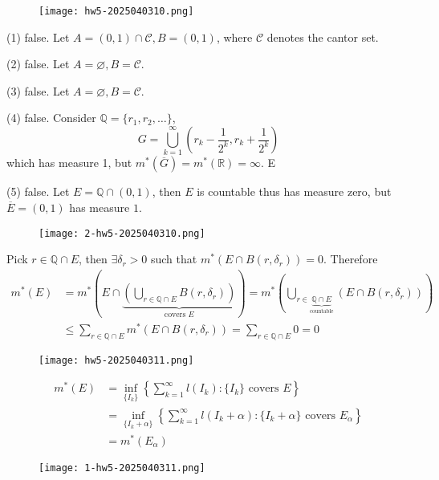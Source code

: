 \begin{figure}[H]
\centering
\texttt{[image: hw5-2025040310.png]}
\label{}
\end{figure}
(1) false. Let $A=(0,1)\cap \mathcal{C},B=(0,1)$, where $\mathcal{C}$ denotes the cantor set.

(2) false. Let $A=\varnothing,B=\mathcal{C}$.

(3) false. Let $A=\varnothing,B=\mathcal{C}$.

(4) false. Consider $\mathbb{Q}=\{ r_1,r_2,\dots \}$,
\[
G=\bigcup_{k=1}^{\infty} \left( r_k-\frac{1}{2^{k}}, r_k+\frac{1}{2^{k}}\right)
\]
which has measure 1, but $m^{*}(\overline{G})=m^{*}(\mathbb{R})=\infty$. E

(5) false. Let $E=\mathbb{Q}\cap(0,1)$, then $E$ is countable thus has measure zero, but $\overline{E}=(0,1)$ has measure $1$.

\begin{figure}[H]
\centering
\texttt{[image: 2-hw5-2025040310.png]}
\label{}
\end{figure}
Pick $r\in \mathbb{Q}\cap E$, then $\exists\delta_{r}>0$ such that $m^{*}(E\cap B(r,\delta_{r}))=0$. Therefore
\[
\begin{aligned}
m^{*}(E) & =m^{*}\left( E\cap\underbrace{ \left( \bigcup_{r\in \mathbb{Q}\cap E}B(r,\delta_{r}) \right) }_{ \text{covers }E } \right)=m^{*}\left( \bigcup_{r\in \underbrace{ \mathbb{Q}\cap E }_{ \text{countable} }}(E\cap B(r,\delta_{r})) \right) \\
 & \leq \sum_{r\in \mathbb{Q}\cap E}m^{*}(E\cap B(r,\delta_{r}))=\sum_{r\in \mathbb{Q}\cap E}0=0
\end{aligned}
\]
\begin{figure}[H]
\centering
\texttt{[image: hw5-2025040311.png]}
\label{}
\end{figure}
\[
\begin{aligned}
m^{*}(E) & =\inf_{\{ I_k \}}\left\{  \sum_{k=1}^{\infty} l(I_k):\{ I_k \}\text{ covers }E  \right\} \\
 & =\inf_{\{ I_k+\alpha \} }\left\{  \sum_{k=1}^{\infty} l(I_k+\alpha): \{ I_k+\alpha \}\text{ covers }E_{\alpha}  \right\} \\
 & =m^{*}(E_{\alpha})
\end{aligned}
\]
\begin{figure}[H]
\centering
\texttt{[image: 1-hw5-2025040311.png]}
\label{}
\end{figure}

